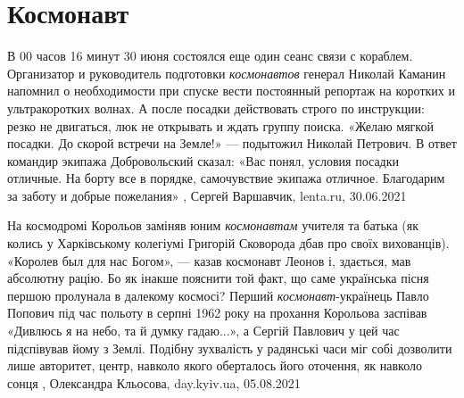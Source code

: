  
 
 
 
 
\chapter{Космонавт}
\label{sec:slova.kosmonavt}

В 00 часов 16 минут 30 июня состоялся еще один сеанс связи с кораблем.
Организатор и руководитель подготовки \emph{космонавтов} генерал Николай Каманин
напомнил о необходимости при спуске вести постоянный репортаж на коротких и
ультракоротких волнах. А после посадки действовать строго по инструкции: резко
не двигаться, люк не открывать и ждать группу поиска.  «Желаю мягкой посадки.
До скорой встречи на Земле!» — подытожил Николай Петрович. В ответ командир
экипажа Добровольский сказал: «Вас понял, условия посадки отличные. На борту
все в порядке, самочувствие экипажа отличное. Благодарим за заботу и добрые
пожелания»
, Сергей Варшавчик, lenta.ru, 30.06.2021

На космодромі Корольов заміняв юним \emph{космонавтам} учителя та батька (як колись у
Харківському колегіумі Григорій Сковорода дбав про своїх вихованців). «Королев
был для нас Богом», — казав космонавт Леонов і, здається, мав абсолютну рацію.
Бо як інакше пояснити той факт, що саме українська пісня першою пролунала в
далекому космосі? Перший \emph{космонавт}-українець Павло Попович під час польоту в
серпні 1962 року на прохання Корольова заспівав «Дивлюсь я на небо, та й думку
гадаю...», а Сергій Павлович у цей час підспівував йому з Землі. Подібну
зухвалість у радянські часи міг собі дозволити лише авторитет, центр, навколо
якого оберталось його оточення, як навколо сонця
, 
Олександра Кльосова, day.kyiv.ua, 05.08.2021
